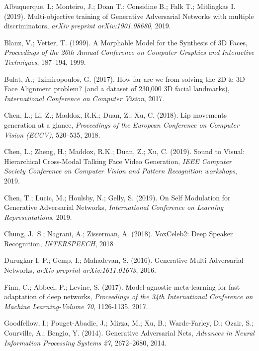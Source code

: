 \documentclass[11pt,a4paper]{article}
\begin{document}
\begin{thebibliography}{11}


 Albuquerque, I.; Monteiro, J.; Doan T.; Considine B.; Falk T.; Mitliagkas I. (2019).
 Multi-objective training of Generative Adversarial Networks with multiple discriminators,
 \emph{arXiv preprint arXiv:1901.08680},
 2019.

 Blanz, V.; Vetter, T. (1999).
 A Morphable Model for the Synthesis of {3D} Faces,
 \emph{Proceedings of the 26th Annual Conference on Computer Graphics and Interactive Techniques},
 187--194, 1999.
 
 Bulat, A.; Tzimiropoulos, G. (2017).
 How far are we from solving the 2D \& 3D Face Alignment problem? (and a dataset of 230,000 3D facial landmarks),
 \emph{International Conference on Computer Vision},
 2017.

 Chen, L.; Li, Z.; Maddox, R.K.; Duan, Z.; Xu, C. (2018).
 Lip movements generation at a glance,
 \emph{Proceedings of the European Conference on Computer Vision (ECCV)},
 520--535, 2018.
 
 Chen, L.; Zheng, H.; Maddox, R.K.; Duan, Z.; Xu, C. (2019).
 Sound to Visual: Hierarchical Cross-Modal Talking Face Video Generation,
 \emph{IEEE Computer Society Conference on Computer Vision and Pattern Recognition workshops},
 2019.
 
 Chen, T.; Lucic, M.; Houlsby, N.; Gelly, S. (2019).
 On Self Modulation for Generative Adversarial Networks,
 \emph{International Conference on Learning Representations},
 2019.
 
 Chung, J.~S.; Nagrani, A.; Zisserman, A. (2018).
 VoxCeleb2: Deep Speaker Recognition,
 \emph{INTERSPEECH},
 2018

 Durugkar I. P.; Gemp, I.; Mahadevan, S. (2016).
 Generative Multi-Adversarial Networks,
 \emph{arXiv preprint arXiv:1611.01673},
 2016.

 Finn, C.; Abbeel, P.; Levine, S. (2017).
 Model-agnostic meta-learning for fast adaptation of deep networks,
 \emph{Proceedings of the 34th International Conference on Machine Learning-Volume 70},
 1126-1135, 2017.
 
 Goodfellow, I.; Pouget-Abadie, J.; Mirza, M.; Xu, B.; Warde-Farley, D.; Ozair, S.; Courville, A.; Bengio, Y. (2014).
 Generative Adversarial Nets,
 \emph{Advances in Neural Information Processing Systems 27},
 2672--2680, 2014.
 

\end{thebibliography}
\end{document}
